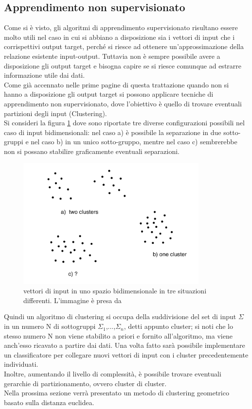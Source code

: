 \newpage

\subsection{Apprendimento non supervisionato}
\label{app_non_sup}

Come si è visto, gli algoritmi di apprendimento supervisionato risultano essere molto utili nel caso in cui si abbiano a disposizione sia i vettori di input che i corrispettivi output target, perché si riesce ad ottenere un'approssimazione della relazione esistente input-output.
Tuttavia non è sempre possibile avere a disposizione gli output target e bisogna capire se si riesce comunque ad estrarre informazione utile dai dati. \\
Come già accennato nelle prime pagine di questa trattazione quando non si hanno a disposizione gli output target si possono applicare tecniche di apprendimento non supervisionato, dove l'obiettivo è quello di trovare eventuali partizioni degli input (Clustering). \\
Si consideri la figura \ref{Unsup} dove sono riportate tre diverse configurazioni possibili nel caso di input bidimensionali: nel caso a) è possibile la separazione in due sotto-gruppi e nel caso b) in un unico sotto-gruppo, mentre nel caso c) sembrerebbe non si possano stabilire graficamente eventuali separazioni.

\begin{figure}[h!]
	\centering
	\includegraphics[width=0.85\textwidth]{figs/Unsup_learning.png}
	\caption{vettori di input in uno spazio bidimensionale in tre situazioni differenti. L'immagine è presa da \cite{IntroML}}
	\label{Unsup}
\end{figure}

Quindi un algoritmo di clustering si occupa della suddivisione del set di input $\Sigma$ in un numero N di sottogruppi $\Sigma_1$,...,$\Sigma_n$, detti appunto cluster; si noti che lo stesso numero N non viene stabilito a priori e fornito all'algoritmo, ma viene anch'esso ricavato a partire dai dati. Una volta fatto sarà possibile implementare un classificatore per collegare nuovi vettori di input con i cluster precedentemente individuati.\\
Inoltre, aumentando il livello di complessità, è possibile trovare eventuali gerarchie di partizionamento, ovvero cluster di cluster.\\
Nella prossima sezione verrà presentato un metodo di clustering geometrico basato sulla distanza euclidea.

